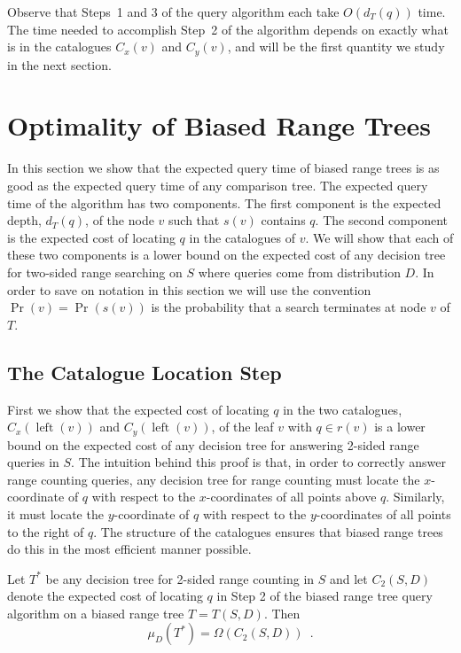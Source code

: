 \documentclass[lotsofwhite,charterfonts]{patmorin}
\DeclareMathOperator{\lft}{left}
\begin{document}
Observe that Steps~1 and 3 of the query algorithm each take
$O(d_T(q))$ time.  The time needed to accomplish Step~2 of the
algorithm depends on exactly what is in the catalogues $C_x(v)$ and
$C_y(v)$, and will be the first quantity we study in the next section.

\section{Optimality of Biased Range Trees}

In this section we show that the expected query time of biased range
trees is as good as the expected query time of any comparison tree.
The expected query time of the algorithm has two components.  The
first component is the expected depth, $d_T(q)$,  of the node $v$ such
that $s(v)$ contains $q$.  The second component is the expected cost
of locating $q$ in the catalogues of $v$.  We will show that each of
these two components is a lower bound on the expected cost of any
decision tree for two-sided range searching on $S$ where queries come
from distribution $D$.  In order to save on notation in this section
we will use the convention $\Pr(v)=\Pr(s(v))$ is the probability that
a search terminates at node $v$ of $T$.

\subsection{The Catalogue Location Step}

First we show that the expected cost of locating $q$ in the two
catalogues, $C_x(\lft(v))$ and $C_y(\lft(v))$, of the leaf $v$
with $q\in r(v)$ is
a lower bound on the expected cost of any decision tree for answering
2-sided range queries in $S$.  The intuition behind this proof is
that, in order to correctly answer range counting queries, any decision tree
for range counting must locate the $x$-coordinate of $q$
with respect to the $x$-coordinates of all points above $q$.  
Similarly, it must locate the $y$-coordinate of $q$ with respect to
the $y$-coordinates of all points to the right of $q$.  The structure
of the catalogues ensures that biased range trees do this in the most
efficient manner possible.
 

\begin{lem}
Let $T^*$ be any decision tree for 2-sided range counting in $S$ and let
$C_2(S,D)$ denote the expected cost of locating $q$ in Step 2 of the
biased range tree query algorithm on a biased range tree $T=T(S,D)$. 
Then
\[
  \mu_D(T^*) = \Omega(C_2(S,D)) \enspace .
\] 
\end{lem}
\end{document}

